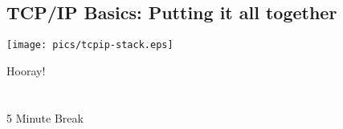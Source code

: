 \documentclass[xga]{xdvislides}
\begin{document}
\subsection{TCP/IP Basics: Putting it all together}
\vspace*{\fill}
\begin{center}
	\texttt{[image: pics/tcpip-stack.eps]}
\end{center}
\vspace*{\fill}


\newpage
\vspace*{\fill}
\begin{center}
    \Hugesize
        Hooray! \\ [1em]
    \hspace*{5mm}
    \blueline\\
    \hspace*{5mm}\\
        5 Minute Break
\end{center}
\vspace*{\fill}
\end{document}
